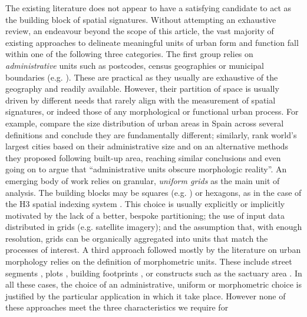 The existing literature does not appear to have a satisfying candidate to act
as the building block of spatial signatures. 
%
Without attempting an exhaustive review, an endeavour beyond the scope of this
article, the vast majority of existing approaches to delineate meaningful
units of urban form and function fall within one of the following three
categories.
The first group relies on \textit{administrative} units such as postcodes, census geographies
or municipal boundaries (e.g. \citealp{taubenbock2020}).
%
These are practical as they usually are exhaustive of the geography and
readily available. However, their partition of space is usually driven by
different needs that rarely align with the measurement of spatial signatures,
or indeed those of any morphological or functional urban process. For example,
\cite{puente2020sensitive} compare the size distribution of urban areas in
Spain across several definitions and conclude they are fundamentally
different; similarly, \cite{taubenbock2019new} rank world's largest cities
based on their administrative size and on an alternative methods they proposed
following built-up area, reaching similar conclusions and even going on to
argue that ``administrative units obscure morphologic reality''.
An emerging body of work relies on granular, \textit{uniform grids} as the main unit of
analysis. The building blocks may be squares (e.g. \citealp{jochem2020}) or
hexagons, as in the case of the H3 spatial indexing system
\citep{brodsky2018h3}. This choice is usually explicitly or implicitly
motivated by the lack of a better, bespoke partitioning; the use of input data distributed
in grids (e.g. satellite imagery); and the assumption that, with enough
resolution, grids can be organically aggregated into units that match the
processes of interest.
A third approach followed mostly by the literature on urban morphology relies
on the definition of morphometric units. These include street segments
\citep{araldi2019}, plots \citep{bobkova2019}, building footprints \citep{schirmer2015}, or constructs such as the
sactuary area \citep{mehaffy2010urban,dibble2019origin}.
In all these cases, the choice of an administrative, uniform or morphometric
choice is justified by the particular application in which it take place.
However none of these approaches meet the three characteristics we require for
